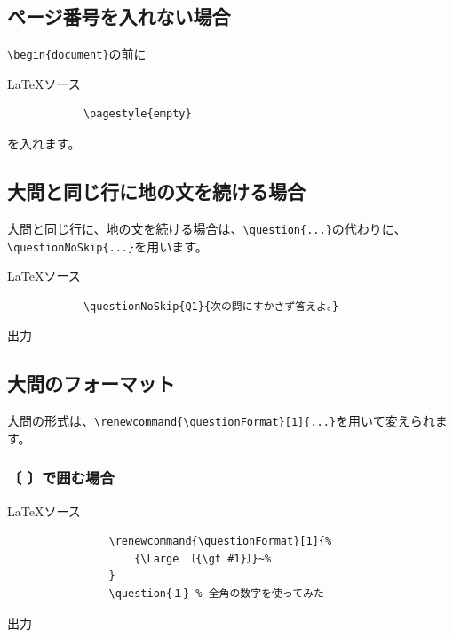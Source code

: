 \documentclass[dvipdfmx,a4j,11pt]{jarticle}
\newenvironment{inputbox}{%
	\begin{itembox}[r]{\LaTeX ソース}
}{
	\end{itembox}
}
\newenvironment{outputbox}{%
	\begin{itembox}[r]{出力}
}{%
	\end{itembox}
}
\begin{document}
\subsection{ページ番号を入れない場合}
	{\tt \verb"\begin{document}"}の前に
	\begin{inputbox}
		\begin{verbatim}
			\pagestyle{empty}
		\end{verbatim}
	\end{inputbox}
	を入れます。
	
\subsection{大問と同じ行に地の文を続ける場合}
	大問と同じ行に、地の文を続ける場合は、{\tt \verb"\question{...}"}の代わりに、
	{\tt \verb"\questionNoSkip{...}"}を用います。
	\begin{inputbox}
		\begin{verbatim}
			\questionNoSkip{Q1}{次の問にすかさず答えよ。}
		\end{verbatim}
	\end{inputbox}
	
	\begin{outputbox}
	\end{outputbox}
	
\subsection{大問のフォーマット}
	大問の形式は、{\tt \verb"\renewcommand{\questionFormat}[1]{...}"}を用いて変えられます。
	\subsubsection{〔 〕で囲む場合}
		\begin{inputbox}
			\begin{verbatim}
				\renewcommand{\questionFormat}[1]{%
					{\Large 〔{\gt #1}〕}~%
				}
				\question{１} % 全角の数字を使ってみた
			\end{verbatim}
		\end{inputbox}
		
		\renewcommand{\questionFormat}[1]{%
			{\Large 〔{\gt #1}〕}~%
		}
		
		\begin{outputbox}
		\end{outputbox}
		
\end{document}
